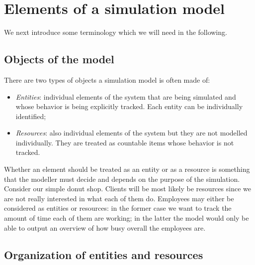 \documentclass[
]{book}
\theoremstyle{definition}
\theoremstyle{definition}
\theoremstyle{definition}
\theoremstyle{definition}
\theoremstyle{remark}
\begin{document}
\hypertarget{elements-of-a-simulation-model}{%
\section{Elements of a simulation model}\label{elements-of-a-simulation-model}}

We next introduce some terminology which we will need in the following.

\hypertarget{objects-of-the-model}{%
\subsection{Objects of the model}\label{objects-of-the-model}}

There are two types of objects a simulation model is often made of:

\begin{itemize}
\item
  \emph{Entities}: individual elements of the system that are being simulated and whose behavior is being explicitly tracked. Each entity can be individually identified;
\item
  \emph{Resources}: also individual elements of the system but they are not modelled individually. They are treated as countable items whose behavior is not tracked.
\end{itemize}

Whether an element should be treated as an entity or as a resource is something that the modeller must decide and depends on the purpose of the simulation. Consider our simple donut shop. Clients will be most likely be resources since we are not really interested in what each of them do. Employees may either be considered as entities or resources: in the former case we want to track the amount of time each of them are working; in the latter the model would only be able to output an overview of how busy overall the employees are.

\hypertarget{organization-of-entities-and-resources}{%
\subsection{Organization of entities and resources}\label{organization-of-entities-and-resources}}
\end{document}
